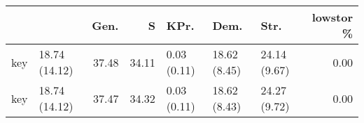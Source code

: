 \begin{tabular}{llrrlllr}
\toprule
     &               &   Gen. &     S & KPr.        & Dem.         & Str.         &   lowstor \% \\
\midrule
 key & 18.74 (14.12) &  37.48 & 34.11 & 0.03 (0.11) & 18.62 (8.45) & 24.14 (9.67) &        0.00 \\
 key & 18.74 (14.12) &  37.47 & 34.32 & 0.03 (0.11) & 18.62 (8.43) & 24.27 (9.72) &        0.00 \\
\bottomrule
\end{tabular}